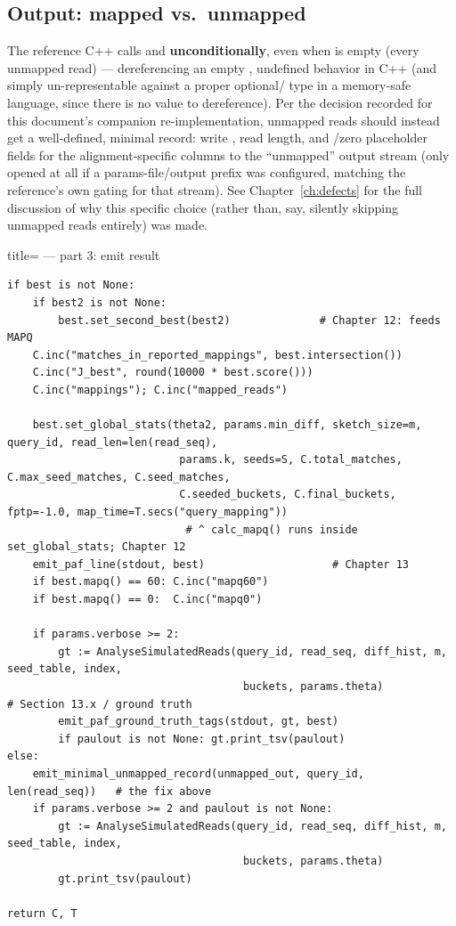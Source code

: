 \subsection{Output: mapped vs.\ unmapped}
\label{sec:map-read-output}

\begin{bugbox}
The reference C++ calls  and 
\textbf{unconditionally}, even when  is empty (every unmapped read) --- dereferencing
an empty , undefined behavior in C++ (and simply un-representable against a
proper optional/ type in a memory-safe language, since there is no value to
dereference). Per the decision recorded for this document's companion re-implementation, unmapped
reads should instead get a well-defined, minimal record: write , read length, and
\code{*}/zero placeholder fields for the alignment-specific columns to the ``unmapped'' output
stream (only opened at all if a params-file/output prefix was configured, matching the
reference's own gating for that stream). See Chapter~\ref{ch:defects} for the full discussion of
why this specific choice (rather than, say, silently skipping unmapped reads entirely) was made.
\end{bugbox}

\begin{algobox}{title={ --- part 3: emit result}}
\begin{verbatim}
if best is not None:
    if best2 is not None:
        best.set_second_best(best2)              # Chapter 12: feeds MAPQ
    C.inc("matches_in_reported_mappings", best.intersection())
    C.inc("J_best", round(10000 * best.score()))
    C.inc("mappings"); C.inc("mapped_reads")

    best.set_global_stats(theta2, params.min_diff, sketch_size=m, query_id, read_len=len(read_seq),
                           params.k, seeds=S, C.total_matches, C.max_seed_matches, C.seed_matches,
                           C.seeded_buckets, C.final_buckets, fptp=-1.0, map_time=T.secs("query_mapping"))
                            # ^ calc_mapq() runs inside set_global_stats; Chapter 12
    emit_paf_line(stdout, best)                    # Chapter 13
    if best.mapq() == 60: C.inc("mapq60")
    if best.mapq() == 0:  C.inc("mapq0")

    if params.verbose >= 2:
        gt := AnalyseSimulatedReads(query_id, read_seq, diff_hist, m, seed_table, index,
                                     buckets, params.theta)                 # Section 13.x / ground truth
        emit_paf_ground_truth_tags(stdout, gt, best)
        if paulout is not None: gt.print_tsv(paulout)
else:
    emit_minimal_unmapped_record(unmapped_out, query_id, len(read_seq))   # the fix above
    if params.verbose >= 2 and paulout is not None:
        gt := AnalyseSimulatedReads(query_id, read_seq, diff_hist, m, seed_table, index,
                                     buckets, params.theta)
        gt.print_tsv(paulout)

return C, T
\end{verbatim}
\end{algobox}


